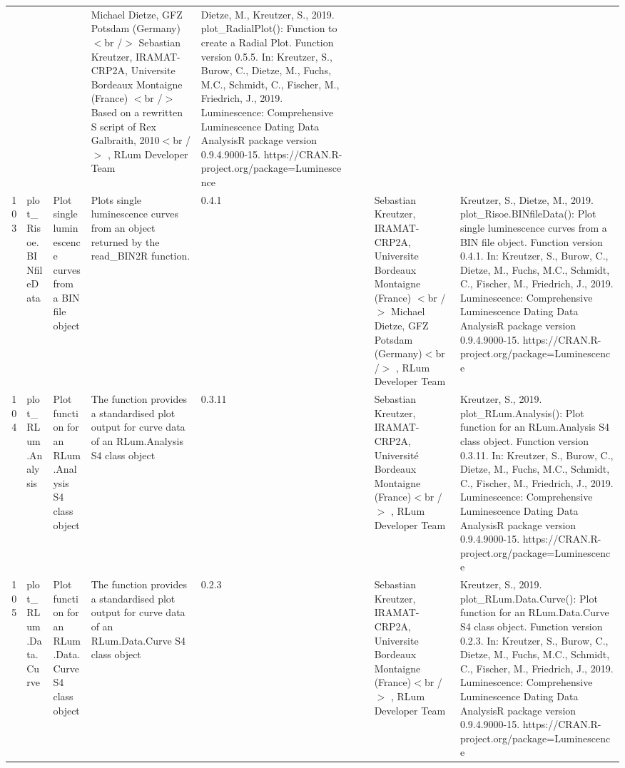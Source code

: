 \begin{table}[ht]
\begin{tabular}{rllllllll}
 &  &  & Michael Dietze, GFZ Potsdam (Germany) $<$br /$>$ Sebastian Kreutzer, IRAMAT-CRP2A, Universite Bordeaux Montaigne (France) $<$br /$>$ Based on a rewritten S script of Rex Galbraith, 2010$<$br /$>$ , RLum Developer Team & Dietze, M., Kreutzer, S., 2019. plot\_RadialPlot(): Function to create a Radial Plot. Function version 0.5.5. In: Kreutzer, S., Burow, C., Dietze, M., Fuchs, M.C., Schmidt, C., Fischer, M., Friedrich, J., 2019. Luminescence: Comprehensive Luminescence Dating Data AnalysisR package version 0.9.4.9000-15. https://CRAN.R-project.org/package=Luminescence
 \\ 
  103 & plot\_Risoe.BINfileData & Plot single luminescence curves from a BIN file object & Plots single luminescence curves from an object returned by the read\_BIN2R  function. & 0.4.1
 &  &  & Sebastian Kreutzer, IRAMAT-CRP2A, Universite Bordeaux Montaigne (France) $<$br /$>$ Michael Dietze, GFZ Potsdam (Germany)$<$br /$>$ , RLum Developer Team & Kreutzer, S., Dietze, M., 2019. plot\_Risoe.BINfileData(): Plot single luminescence curves from a BIN file object. Function version 0.4.1. In: Kreutzer, S., Burow, C., Dietze, M., Fuchs, M.C., Schmidt, C., Fischer, M., Friedrich, J., 2019. Luminescence: Comprehensive Luminescence Dating Data AnalysisR package version 0.9.4.9000-15. https://CRAN.R-project.org/package=Luminescence
 \\ 
  104 & plot\_RLum.Analysis & Plot function for an RLum.Analysis S4 class object & The function provides a standardised plot output for curve data of an RLum.Analysis S4 class object & 0.3.11
 &  &  & Sebastian Kreutzer, IRAMAT-CRP2A, Université Bordeaux Montaigne (France)$<$br /$>$ , RLum Developer Team & Kreutzer, S., 2019. plot\_RLum.Analysis(): Plot function for an RLum.Analysis S4 class object. Function version 0.3.11. In: Kreutzer, S., Burow, C., Dietze, M., Fuchs, M.C., Schmidt, C., Fischer, M., Friedrich, J., 2019. Luminescence: Comprehensive Luminescence Dating Data AnalysisR package version 0.9.4.9000-15. https://CRAN.R-project.org/package=Luminescence
 \\ 
  105 & plot\_RLum.Data.Curve & Plot function for an RLum.Data.Curve S4 class object & The function provides a standardised plot output for curve data of an RLum.Data.Curve S4 class object & 0.2.3
 &  &  & Sebastian Kreutzer, IRAMAT-CRP2A, Universite Bordeaux Montaigne (France)$<$br /$>$ , RLum Developer Team & Kreutzer, S., 2019. plot\_RLum.Data.Curve(): Plot function for an RLum.Data.Curve S4 class object. Function version 0.2.3. In: Kreutzer, S., Burow, C., Dietze, M., Fuchs, M.C., Schmidt, C., Fischer, M., Friedrich, J., 2019. Luminescence: Comprehensive Luminescence Dating Data AnalysisR package version 0.9.4.9000-15. https://CRAN.R-project.org/package=Luminescence

\end{tabular}
\end{table}
